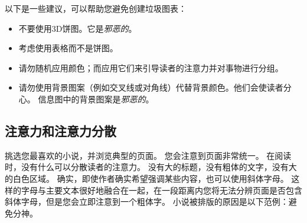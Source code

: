 
以下是一些建议，可以帮助您避免创建垃圾图表：
%
\begin{itemize}
    \item 不要使用3D饼图。它是\emph{邪恶的}。
    \item 考虑使用表格而不是饼图。
    \item 请勿随机应用颜色；而应用它们来引导读者的注意力并对事物进行分组。
    \item 请勿使用背景图案（例如交叉线或对角线）代替背景颜色。他们会使读者分心。 信息图中的背景图案是\emph{邪恶的}。
\end{itemize}


\subsection{注意力和注意力分散}


挑选您最喜欢的小说，并浏览典型的页面。 您会注意到页面非常统一。 在阅读时，没有什么可以分散读者的注意力。 没有大的标题，没有粗体的文字，没有大的白色区域。 确实，即使作者确实希望强调某些内容，也可以使用斜体字母。 这样的字母与主要文本很好地融合在一起，在一段距离内您将无法分辨页面是否包含斜体字母，但是您会立即注意到一个粗体字。 小说被排版的原因是以下范例：避免分神。

